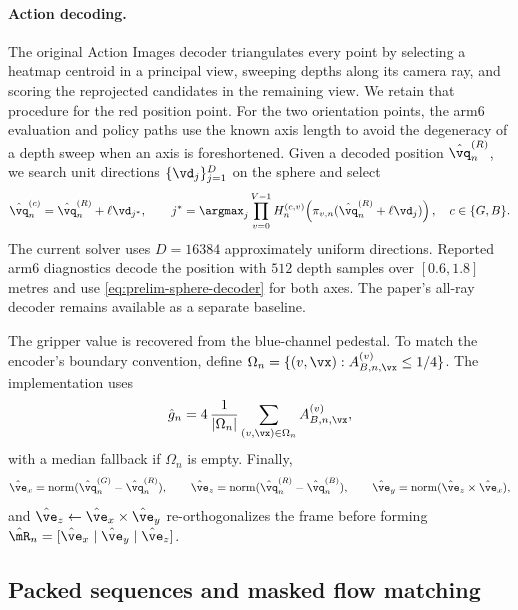 \paragraph{Action decoding.}
The original Action Images decoder triangulates every point by selecting a heatmap centroid in a
principal view, sweeping depths along its camera ray, and scoring the reprojected candidates in
the remaining view. We retain that procedure for the red position point. For the two orientation
points, the arm6 evaluation and policy paths use the known axis length to avoid the degeneracy of
a depth sweep when an axis is foreshortened. Given a decoded position $\hat\vq^{(R)}_n$, we search
unit directions $\{\vd_j\}_{j=1}^{D}$ on the sphere and select
\begin{equation}
    \hat\vq^{(c)}_n
    =\hat\vq^{(R)}_n+\ell\vd_{j^*},
    \qquad
    j^*=\argmax_j\prod_{v=0}^{V-1}
    H^{(c,v)}_n\!\left(
        \pi_{v,n}(\hat\vq^{(R)}_n+\ell\vd_j)
    \right),
    \quad c\in\{G,B\}.
    \label{eq:prelim-sphere-decoder}
\end{equation}
The current solver uses $D=16384$ approximately uniform directions. Reported arm6 diagnostics
decode the position with $512$ depth samples over $[0.6,1.8]$ metres and use
\eqref{eq:prelim-sphere-decoder} for both axes. The paper's all-ray decoder remains available as a
separate baseline.

The gripper value is recovered from the blue-channel pedestal. To match the encoder's boundary
convention, define
$\Omega_n=\{(v,\vx):A^{(v)}_{B,n,\vx}\leq1/4\}$. The implementation uses
\begin{equation}
    \hat g_n
    =4\,\frac{1}{|\Omega_n|}
      \sum_{(v,\vx)\in\Omega_n}A^{(v)}_{B,n,\vx},
    \label{eq:prelim-openness-decoder}
\end{equation}
with a median fallback if $\Omega_n$ is empty. Finally,
\begin{equation}
    \hat\ve_x=\operatorname{norm}(\hat\vq^{(G)}_n-\hat\vq^{(R)}_n),\qquad
    \hat\ve_z=\operatorname{norm}(\hat\vq^{(R)}_n-\hat\vq^{(B)}_n),\qquad
    \hat\ve_y=\operatorname{norm}(\hat\ve_z\times\hat\ve_x),
    \label{eq:prelim-rotation-decoder}
\end{equation}
and $\hat\ve_z\leftarrow\hat\ve_x\times\hat\ve_y$ re-orthogonalizes the frame before forming
$\hat\mR_n=[\hat\ve_x\mid\hat\ve_y\mid\hat\ve_z]$.

\subsection{Packed sequences and masked flow matching}
\label{sec:prelim-objective}

